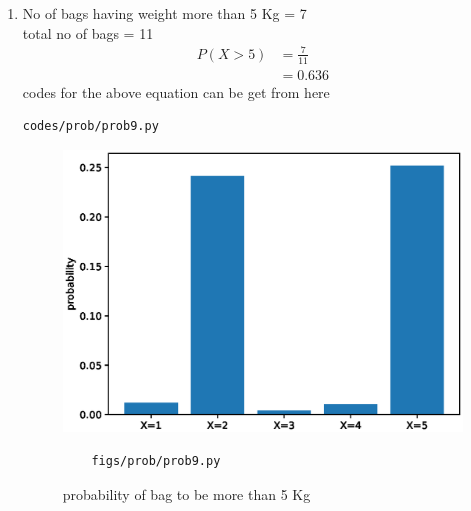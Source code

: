 \renewcommand{\theequation}{\theenumi}
\begin{enumerate}[label=\arabic*.,ref=\thesubsection.\theenumi]
\item No of bags having weight more than 5 Kg = 7
\\
total no of bags = 11
\begin{align}
P\left(X>5\right) &= \frac{7}{11}
\\
&=0.636
\end{align}
codes for the above equation can be get from here
\begin{lstlisting}
codes/prob/prob9.py
\end{lstlisting}
\begin{figure}[!ht]
	\centering
	\includegraphics[width=\columnwidth]{./figures/prob/prob8.eps}
	\caption{probability of bag to be more than 5 Kg  }
	\label{fig:bt9}
	\begin{lstlisting}
	figs/prob/prob9.py
	\end{lstlisting}
\end{figure}
\end{enumerate}